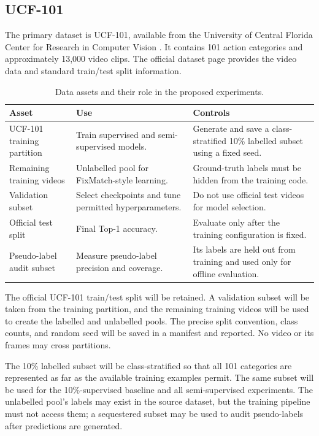 \documentclass[11pt,a4paper]{article}
\begin{document}
\subsection{UCF-101}
The primary dataset is UCF-101, available from the University of Central Florida Center for Research in Computer Vision \cite{ucf101}. It contains 101 action categories and approximately 13,000 video clips. The official dataset page provides the video data and standard train/test split information.

\begin{table}[H]
\centering
\small
\caption{Data assets and their role in the proposed experiments.}
\begin{tabularx}{\textwidth}{L{2.5cm}Y Y}
\toprule
\textbf{Asset} & \textbf{Use} & \textbf{Controls} \\
\midrule
UCF-101 training partition & Train supervised and semi-supervised models. & Generate and save a class-stratified 10\% labelled subset using a fixed seed. \\
Remaining training videos & Unlabelled pool for FixMatch-style learning. & Ground-truth labels must be hidden from the training code. \\
Validation subset & Select checkpoints and tune permitted hyperparameters. & Do not use official test videos for model selection. \\
Official test split & Final Top-1 accuracy. & Evaluate only after the training configuration is fixed. \\
Pseudo-label audit subset & Measure pseudo-label precision and coverage. & Its labels are held out from training and used only for offline evaluation. \\
\bottomrule
\end{tabularx}
\end{table}

The official UCF-101 train/test split will be retained. A validation subset will be taken from the training partition, and the remaining training videos will be used to create the labelled and unlabelled pools. The precise split convention, class counts, and random seed will be saved in a manifest and reported. No video or its frames may cross partitions.

The 10\% labelled subset will be class-stratified so that all 101 categories are represented as far as the available training examples permit. The same subset will be used for the 10\%-supervised baseline and all semi-supervised experiments. The unlabelled pool's labels may exist in the source dataset, but the training pipeline must not access them; a sequestered subset may be used to audit pseudo-labels after predictions are generated.
\end{document}
